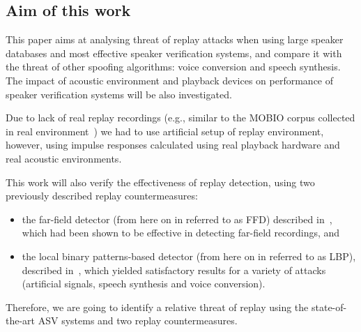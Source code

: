 

\subsection{Aim of this work}

This paper aims at analysing threat of replay attacks when using large speaker databases and most effective speaker verification systems, and compare it with the threat of other spoofing algorithms: voice conversion and speech synthesis. The impact of acoustic environment and playback devices on performance of speaker verification systems will be also investigated. 

Due to lack of real replay recordings (e.g., similar to the MOBIO corpus collected in real environment~\cite{Khoury2013a}) we had to use artificial setup of replay environment, however, using impulse responses calculated using real playback hardware and real acoustic environments. 

This work will also verify the effectiveness of replay detection, using two previously described replay countermeasures: 
\begin{itemize}
\item the far-field detector (from here on in referred to as FFD) described in~\cite{Villalba2011}, which had been shown to be effective in detecting far-field recordings, and 
\item the local binary patterns-based detector (from here on in referred to as LBP), described in~\cite{Alegre2013a}, which yielded satisfactory results for a variety of attacks (artificial signals, speech synthesis and voice conversion).
\end{itemize}
Therefore, we are going to identify a relative threat of replay using the state-of-the-art ASV systems and two replay countermeasures.
